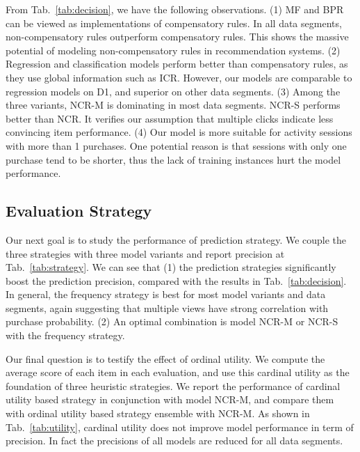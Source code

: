 \documentclass[sigconf]{acmart}
\begin{document}
From Tab.~\ref{tab:decision}, we have the following observations. (1) MF and BPR can be viewed as implementations of compensatory rules. In all data segments, non-compensatory rules outperform compensatory rules. This shows the massive potential of modeling non-compensatory rules in recommendation systems. (2) Regression and classification models perform better than compensatory rules, as they use global information such as ICR. However, our models are comparable to regression models on D1, and superior on other data segments. (3) Among the three variants, NCR-M is dominating in most data segments. NCR-S performs better than NCR. It verifies our assumption that multiple clicks indicate less convincing item performance. (4) Our model is more suitable for activity sessions with more than 1 purchases. One potential reason is that sessions with only one purchase tend to be shorter, thus the lack of training instances hurt the model performance.  



\subsection{Evaluation Strategy}


Our next goal is to study the performance of prediction strategy. We couple the three strategies with three model variants and report precision at Tab.~\ref{tab:strategy}. We can see that (1) the prediction strategies significantly boost the prediction precision, compared with the results in Tab.~\ref{tab:decision}. In general, the frequency strategy is best for most model variants and data segments, again suggesting that multiple views have strong correlation with purchase probability.  (2) An optimal combination is model NCR-M or NCR-S with the frequency strategy. 




Our final question is to testify the effect of ordinal utility. We compute the average score of each item in each evaluation, and use this cardinal utility as the foundation of three heuristic strategies. We report the performance of cardinal utility based strategy in conjunction with model NCR-M, and compare them with ordinal utility based strategy ensemble with NCR-M. As shown in Tab.~\ref{tab:utility}, cardinal utility does not improve model performance in term of precision. In fact the precisions of all models are reduced for all data segments. 
\end{document}

